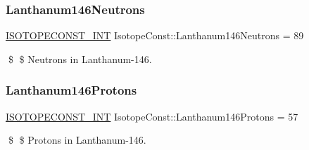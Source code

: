 \subsubsection{\texorpdfstring{Lanthanum146\+Neutrons}{Lanthanum146Neutrons}}
{\footnotesize\ttfamily \mbox{\hyperlink{group___isotope_const-_macros_ga5f18360b3e99483a35c32d789e62621c}{I\+S\+O\+T\+O\+P\+E\+C\+O\+N\+S\+T\+\_\+\+I\+NT}} Isotope\+Const\+::\+Lanthanum146\+Neutrons = 89}

\$ \$ Neutrons in Lanthanum-\/146. \mbox{\label{group___isotope_const-_lanthanum-_la146_ga08ac4a2d6a9a702328930e1a94586563}} 
\subsubsection{\texorpdfstring{Lanthanum146\+Protons}{Lanthanum146Protons}}
{\footnotesize\ttfamily \mbox{\hyperlink{group___isotope_const-_macros_ga5f18360b3e99483a35c32d789e62621c}{I\+S\+O\+T\+O\+P\+E\+C\+O\+N\+S\+T\+\_\+\+I\+NT}} Isotope\+Const\+::\+Lanthanum146\+Protons = 57}

\$ \$ Protons in Lanthanum-\/146. 